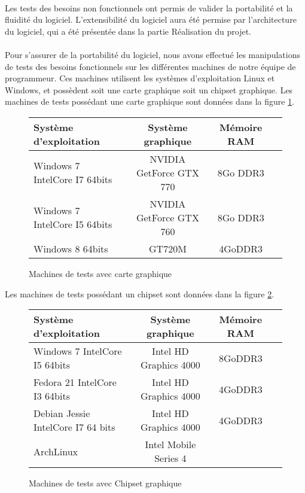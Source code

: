 \paragraph{}
Les tests des besoins non fonctionnels ont permis de valider la portabilité et la fluidité du logiciel. L'extensibilité du logiciel aura été permise par l'architecture du logiciel, qui a été présentée dans la partie Réalisation du projet.

\paragraph{}
Pour s'assurer de la portabilité du logiciel, nous avons effectué les manipulations de tests des besoins fonctionnels sur les différentes machines de notre équipe de programmeur. Ces machines utilisent les systèmes d'exploitation Linux et Windows, et possèdent soit une carte graphique soit un chipset graphique. Les machines de tests possédant une carte graphique sont données dans la figure \ref{tab:machines_cg}.

\begin{figure}[h]
  \begin{changemargin}{-4cm}{-4cm}
    \centering
    \begin{tabular}{|l|c|c|c|}
      \hline
      Système d'exploitation & Système graphique & Mémoire RAM \\ \hline \hline
      Windows 7 IntelCore I7 64bits & NVIDIA GetForce GTX 770 & 8Go DDR3 \\ \hline
      Windows 7 IntelCore I5 64bits & NVIDIA GetForce GTX 760 & 8Go DDR3 \\ \hline
      Windows 8 64bits & GT720M & 4GoDDR3 \\ \hline
    \end{tabular}
  \end{changemargin}
  \caption{Machines de tests avec carte graphique}
  \label{tab:machines_cg}
\end{figure}

Les machines de tests possédant un chipset sont données dans la figure \ref{tab:machines_chip}.

\begin{figure}[h]
  \begin{changemargin}{-4cm}{-4cm}
    \centering
    \begin{tabular}{|l|c|c|c|}
      \hline
      Système d'exploitation & Système graphique & Mémoire RAM \\ \hline \hline
      Windows 7 IntelCore I5 64bits & Intel HD Graphics 4000 & 8GoDDR3 \\ \hline
      Fedora 21 IntelCore I3 64bits & Intel HD Graphics 4000 & 4GoDDR3 \\ \hline
      Debian Jessie IntelCore I7 64 bits & Intel HD Graphics 4000 & 4GoDDR3 \\ \hline
      ArchLinux & Intel Mobile Series 4 & \\ \hline
    \end{tabular}
  \end{changemargin}
  \caption{Machines de tests avec Chipset graphique}
  \label{tab:machines_chip}
\end{figure}

